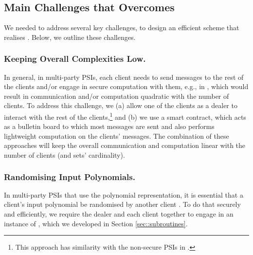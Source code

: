 

\subsection{Main Challenges that \withFai Overcomes}\label{sec::Justitia-challenges}

 We needed to address several key challenges, to design an efficient scheme that realises \p. Below, we outline these challenges.
 

 \subsubsection{Keeping Overall Complexities Low.}
 
 In general, in multi-party PSIs, each client needs to send messages to the rest of the clients and/or engage in secure computation with them, e.g., in \cite{DBLP:conf/scn/InbarOP18,DBLP:conf/ccs/KolesnikovMPRT17}, which would result in communication and/or computation quadratic with the number of clients. To address this challenge, we  (a) allow one of the clients as a dealer to interact with the rest of the clients,\footnote{This approach has similarity with the non-secure PSIs in \cite{GhoshN19}.} and   (b) we use a smart contract, which acts as a bulletin board to which most messages are sent and also performs lightweight computation on the clients' messages. The combination of these approaches will keep the overall communication and computation linear with the number of clients (and sets' cardinality). 
 
 

 
 \subsubsection{Randomising Input Polynomials.}  In multi-party PSIs that use the polynomial representation, it is essential that a client's input polynomial be randomised by another client \cite{AbadiMZ21}. To do that securely and efficiently, we require the dealer and each client together to engage in an instance of \vopr, which we developed in Section \ref{sec::subroutines}. 
 

 
